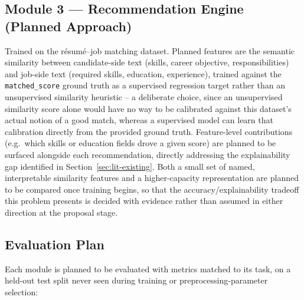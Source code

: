 \documentclass[11pt,a4paper]{article}
\begin{document}
\subsection{Module 3 --- Recommendation Engine (Planned Approach)}
\label{sec:module3-design}

Trained on the r\'esum\'e--job matching dataset. Planned features are the semantic
similarity between candidate-side text (skills, career objective, responsibilities) and
job-side text (required skills, education, experience), trained against the
\texttt{matched\_score} ground truth as a supervised regression target rather than an
unsupervised similarity heuristic -- a deliberate choice, since an unsupervised
similarity score alone would have no way to be calibrated against this dataset's actual
notion of a good match, whereas a supervised model can learn that calibration directly
from the provided ground truth. Feature-level contributions (e.g.\ which skills or
education fields drove a given score) are planned to be surfaced alongside each
recommendation, directly addressing the explainability gap identified in
Section~\ref{sec:lit-existing}. Both a small set of named, interpretable similarity
features and a higher-capacity representation are planned to be compared once training
begins, so that the accuracy/explainability tradeoff this problem presents is decided
with evidence rather than assumed in either direction at the proposal stage.

\subsection{Evaluation Plan}
\label{sec:evaluation-plan}

Each module is planned to be evaluated with metrics matched to its task, on a held-out
test split never seen during training or preprocessing-parameter selection:
\end{document}
